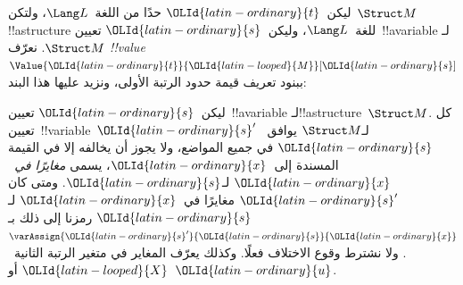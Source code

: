 \documentclass[../../../include/open-logic-section]{subfiles}
\begin{document}
\begin{defn}
ليكن~${\OLId{latin-ordinary}{t}}$ حدًا من اللغة~$\Lang L$، ولتكن~$\Struct M$
!!a{structure} للغة~$\Lang L$، وليكن~${\OLId{latin-ordinary}{s}}$ تعيين~!!a{variable}
لـ$\Struct M$. نعرّف \emph{!!{value}}~$\Value{{\OLId{latin-ordinary}{t}}}{{\OLId{latin-looped}{M}}}[{\OLId{latin-ordinary}{s}}]$ ببنود
تعريف قيمة حدود الرتبة الأولى، ونزيد عليها هذا البند:
\begin{quote}
\end{quote}
\end{defn}

\begin{defn}
ليكن~${\OLId{latin-ordinary}{s}}$ تعيين~!!a{variable} لـ!!a{structure}~$\Struct M$.
كل تعيين~!!{variable}~${\OLId{latin-ordinary}{s}}'$ لـ$\Struct M$ يوافق~${\OLId{latin-ordinary}{s}}$ في جميع
المواضع، ولا يجوز أن يخالفه إلا في القيمة المسندة إلى~${\OLId{latin-ordinary}{x}}$، يسمى
\emph{مغايرًا في~${\OLId{latin-ordinary}{x}}$} لـ${\OLId{latin-ordinary}{s}}$. ومتى كان
${\OLId{latin-ordinary}{s}}'$ مغايرًا في~${\OLId{latin-ordinary}{x}}$ لـ${\OLId{latin-ordinary}{s}}$ رمزنا إلى ذلك
بـ$\varAssign{{\OLId{latin-ordinary}{s}}'}{{\OLId{latin-ordinary}{s}}}{{\OLId{latin-ordinary}{x}}}$. ولا نشترط وقوع الاختلاف فعلًا.
وكذلك يعرّف المغاير في متغير الرتبة الثانية~${\OLId{latin-looped}{X}}$ أو~${\OLId{latin-ordinary}{u}}$.
\end{defn}
\end{document}
